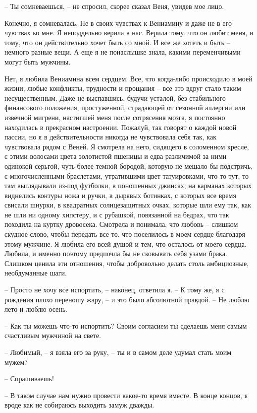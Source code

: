 \documentclass[
]{book}
\begin{document}
-- Ты сомневаешься, -- не спросил, скорее сказал Веня, увидев мое лицо.

Конечно, я сомневалась. Не в своих чувствах к Вениамину и даже не в его чувствах ко мне. Я неподдельно верила в нас. Верила тому, что он любит меня, и тому, что он действительно хочет быть со мной. И все же хотеть и быть -- немного разные вещи. А еще я не понаслышке знала, какими переменчивыми могут быть мужчины.

Нет, я любила Вениамина всем сердцем. Все, что когда-либо происходило в моей жизни, любые конфликты, трудности и прощания -- все это вдруг стало таким несущественным. Даже не выспавшись, будучи усталой, без стабильного финансового положения, простуженной, страдающей от сезонной аллергии или извечной мигрени, настигшей меня после сотрясения мозга, я постоянно находилась в прекрасном настроении. Пожалуй, так говорят о каждой новой пассии, но я в действительности никогда не чувствовала себя так, как чувствовала рядом с Веней. Я смотрела на него, сидящего в соломенном кресле, с этими волосами цвета золотистой пшеницы и едва различимой за ними одинокой серьгой, чуть более темной бородой, которую не мешало бы подстричь, с многочисленными браслетами, утратившими цвет татуировками, что то тут, то там выглядывали из-под футболки, в поношенных джинсах, на карманах которых виднелись контуры ножа и ручки, в дырявых ботинках, с которых все время свисали шнурки, в квадратных солнцезащитных очках, которые шли ему так, как не шли ни одному хипстеру, и с рубашкой, повязанной на бедрах, что так походила на куртку дровосека. Смотрела и понимала, что любовь -- слишком скудное слово, чтобы передать все то, что поселилось в моем сердце благодаря этому мужчине. Я любила его всей душой и тем, что осталось от моего сердца. Любила, и именно поэтому предпочла бы не сковывать себя узами брака. Слишком ценила эти отношения, чтобы добровольно делать столь амбициозные, необдуманные шаги.

-- Просто не хочу все испортить, -- наконец, ответила я. -- К тому же, я с рождения плохо переношу жару, -- и это было абсолютной правдой. -- Не люблю лето и люблю осень.

-- Как ты можешь что-то испортить? Своим согласием ты сделаешь меня самым счастливым мужчиной на свете.

-- Любимый, -- я взяла его за руку, -- ты и в самом деле удумал стать моим мужем?

-- Спрашиваешь!

-- В таком случае нам нужно провести какое-то время вместе. В конце концов, я вроде как не собираюсь выходить замуж дважды.
\end{document}
